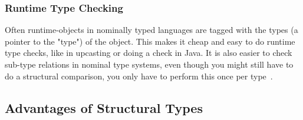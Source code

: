 %
%
%

\subsubsection{Runtime Type Checking}\label{subsubsec:runtime-type-checking}

Often runtime-objects in nominally typed languages are tagged with the types (a pointer to the "type") of the object.
This makes it cheap and easy to do runtime type checks, like in upcasting or doing a  check in Java.
It is also easier to check sub-type relations in nominal type systems, even though you might still have to do a structural comparison, you only have to perform this once per type~\cite{tapl}.

\subsection{Advantages of Structural Types}\label{subsec:advantages-of-structural-types}

